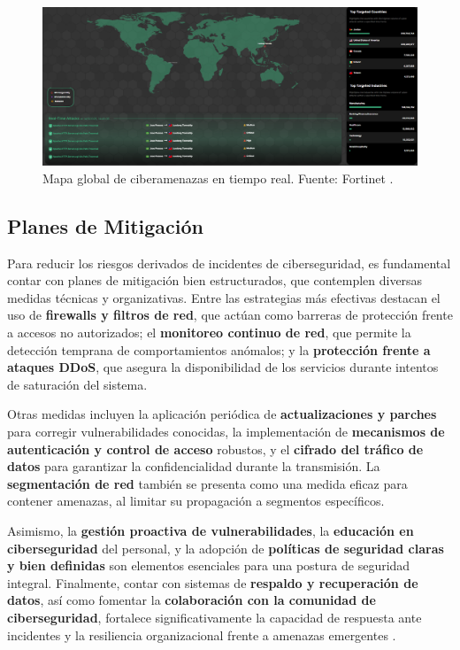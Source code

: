 \documentclass[a4paper, 10pt]{article}
\begin{document}
\begin{figure}[H]
    \centering
    \includegraphics[width=\textwidth]{images/mapa.png}
    \caption{Mapa global de ciberamenazas en tiempo real. Fuente: Fortinet \cite{fortinet}.}
    \label{fig:mapa-fortiguard}
\end{figure}

\subsection{Planes de Mitigación}

Para reducir los riesgos derivados de incidentes de ciberseguridad, es fundamental contar con planes de mitigación bien estructurados, 
que contemplen diversas medidas técnicas y organizativas. 
Entre las estrategias más efectivas destacan el uso de \textbf{firewalls y filtros de red}, que actúan como barreras de 
protección frente a accesos no autorizados; el \textbf{monitoreo continuo de red}, que permite la detección temprana de comportamientos anómalos; 
y la \textbf{protección frente a ataques DDoS}, que asegura la disponibilidad de los servicios durante intentos de saturación del sistema.

\par\vspace{0.5cm}

Otras medidas incluyen la aplicación periódica de \textbf{actualizaciones y parches} para corregir vulnerabilidades conocidas, 
la implementación de \textbf{mecanismos de autenticación y control de acceso} robustos, y el \textbf{cifrado del tráfico de datos} para garantizar la confidencialidad 
durante la transmisión. La \textbf{segmentación de red} también se presenta como una medida eficaz para contener amenazas, al limitar su propagación a segmentos específicos.
\par\vspace{0.5cm}

Asimismo, la \textbf{gestión proactiva de vulnerabilidades}, la \textbf{educación en ciberseguridad} del personal, y la adopción de \textbf{políticas de seguridad claras y bien definidas} son elementos esenciales para una postura de seguridad integral. Finalmente, contar con sistemas de \textbf{respaldo y recuperación de datos}, así como fomentar la \textbf{colaboración con la comunidad de ciberseguridad}, fortalece significativamente la capacidad de respuesta ante incidentes y la resiliencia organizacional frente a amenazas emergentes \cite{mitigacion}.
\end{document}
